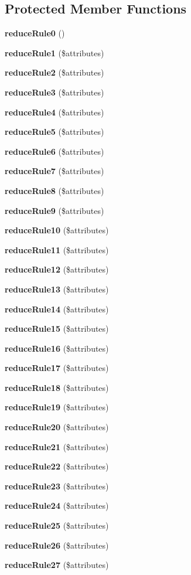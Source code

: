 \subsection*{Protected Member Functions}
\begin{DoxyCompactItemize}
\item 
{\bf reduce\+Rule0} ()
\item 
{\bf reduce\+Rule1} (\$attributes)
\item 
{\bf reduce\+Rule2} (\$attributes)
\item 
{\bf reduce\+Rule3} (\$attributes)
\item 
{\bf reduce\+Rule4} (\$attributes)
\item 
{\bf reduce\+Rule5} (\$attributes)
\item 
{\bf reduce\+Rule6} (\$attributes)
\item 
{\bf reduce\+Rule7} (\$attributes)
\item 
{\bf reduce\+Rule8} (\$attributes)
\item 
{\bf reduce\+Rule9} (\$attributes)
\item 
{\bf reduce\+Rule10} (\$attributes)
\item 
{\bf reduce\+Rule11} (\$attributes)
\item 
{\bf reduce\+Rule12} (\$attributes)
\item 
{\bf reduce\+Rule13} (\$attributes)
\item 
{\bf reduce\+Rule14} (\$attributes)
\item 
{\bf reduce\+Rule15} (\$attributes)
\item 
{\bf reduce\+Rule16} (\$attributes)
\item 
{\bf reduce\+Rule17} (\$attributes)
\item 
{\bf reduce\+Rule18} (\$attributes)
\item 
{\bf reduce\+Rule19} (\$attributes)
\item 
{\bf reduce\+Rule20} (\$attributes)
\item 
{\bf reduce\+Rule21} (\$attributes)
\item 
{\bf reduce\+Rule22} (\$attributes)
\item 
{\bf reduce\+Rule23} (\$attributes)
\item 
{\bf reduce\+Rule24} (\$attributes)
\item 
{\bf reduce\+Rule25} (\$attributes)
\item 
{\bf reduce\+Rule26} (\$attributes)
\item 
{\bf reduce\+Rule27} (\$attributes)
\item 

\end{DoxyCompactItemize}
